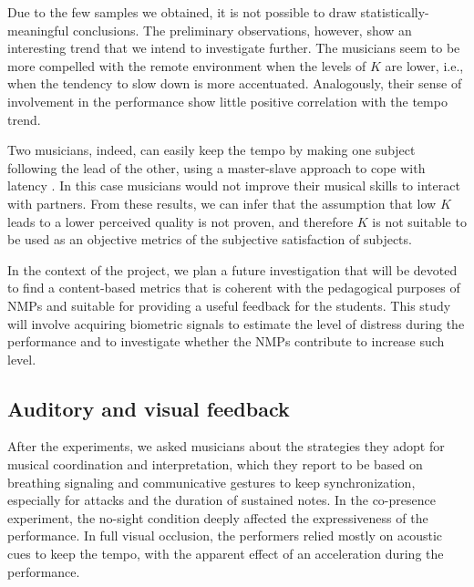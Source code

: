 Due to the few samples we obtained, it is not possible to draw statistically-meaningful conclusions. The preliminary observations, however, show an interesting trend that we intend to investigate further. The musicians seem to be more compelled with the remote environment when the levels of $K$ are lower, i.e., when the tendency to slow down is more accentuated. Analogously, their sense of involvement in the performance show little positive correlation with the tempo trend. 

Two musicians, indeed, can easily keep the tempo by making one subject following the lead of the other, using a master-slave approach to cope with latency \cite{Carot07networkmusic}. In this case musicians would not improve their musical skills to interact with partners. From these results, we can infer that the assumption that low $K$ leads to a lower perceived quality is not proven, and therefore $K$ is not suitable to be used as an objective metrics of the subjective satisfaction of subjects. 

In the context of the project, we plan a future investigation that will be devoted to find a content-based metrics that is coherent with the pedagogical purposes of NMPs and suitable for providing a 
useful feedback for the students.%
This study will involve acquiring %
biometric signals to estimate the level of distress during the performance and to investigate whether the NMPs contribute to increase such level. 

\subsection{Auditory and visual feedback}
After the experiments, we asked musicians about the strategies they adopt for 
musical coordination and interpretation, which they report to be based on breathing signaling and communicative gestures to keep synchronization, especially for attacks and the duration of sustained notes. In the co-presence experiment, %
the no-sight condition deeply affected the expressiveness of the performance. In full visual occlusion, the performers relied mostly on acoustic cues to keep the tempo, with the apparent effect of an acceleration during the performance. 

